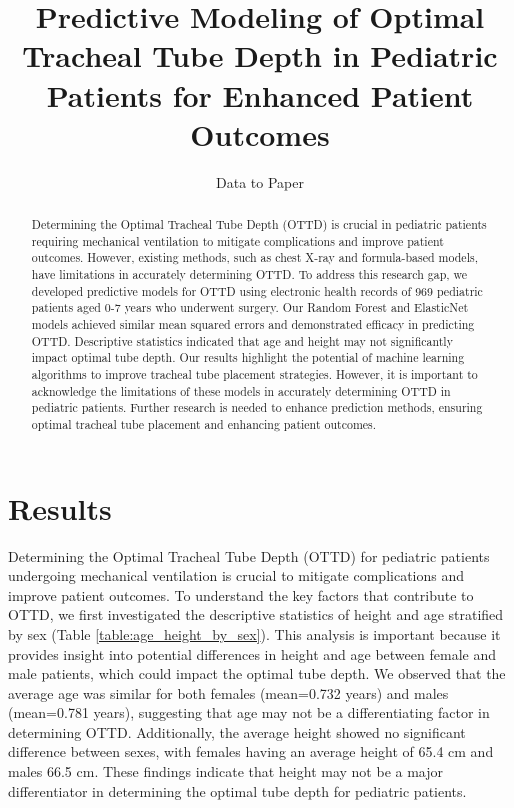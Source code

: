\documentclass[11pt]{article}
\title{Predictive Modeling of Optimal Tracheal Tube Depth in Pediatric Patients for Enhanced Patient Outcomes}
\author{Data to Paper}
\begin{document}
\maketitle
\begin{abstract}
Determining the Optimal Tracheal Tube Depth (OTTD) is crucial in pediatric patients requiring mechanical ventilation to mitigate complications and improve patient outcomes. However, existing methods, such as chest X-ray and formula-based models, have limitations in accurately determining OTTD. To address this research gap, we developed predictive models for OTTD using electronic health records of 969 pediatric patients aged 0-7 years who underwent surgery. Our Random Forest and ElasticNet models achieved similar mean squared errors and demonstrated efficacy in predicting OTTD. Descriptive statistics indicated that age and height may not significantly impact optimal tube depth. Our results highlight the potential of machine learning algorithms to improve tracheal tube placement strategies. However, it is important to acknowledge the limitations of these models in accurately determining OTTD in pediatric patients. Further research is needed to enhance prediction methods, ensuring optimal tracheal tube placement and enhancing patient outcomes.
\end{abstract}
\section*{Results}

Determining the Optimal Tracheal Tube Depth (OTTD) for pediatric patients undergoing mechanical ventilation is crucial to mitigate complications and improve patient outcomes. To understand the key factors that contribute to OTTD, we first investigated the descriptive statistics of height and age stratified by sex (Table {}\ref{table:age_height_by_sex}). This analysis is important because it provides insight into potential differences in height and age between female and male patients, which could impact the optimal tube depth. We observed that the average age was similar for both females (mean=0.732 years) and males (mean=0.781 years), suggesting that age may not be a differentiating factor in determining OTTD. Additionally, the average height showed no significant difference between sexes, with females having an average height of 65.4 cm and males 66.5 cm. These findings indicate that height may not be a major differentiator in determining the optimal tube depth for pediatric patients.
\end{document}
